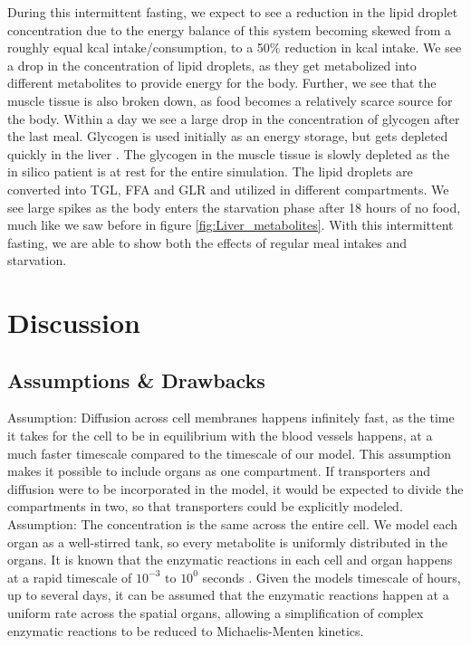 \documentclass{IEEEtran}
\begin{document}
During this intermittent fasting, we expect to see a reduction in the lipid droplet concentration due to the energy balance of this system becoming skewed from a roughly equal kcal intake/consumption, to a 50\% reduction in kcal intake. We see a drop in the concentration of lipid droplets, as they get metabolized into different metabolites to provide energy for the body. Further, we see that the muscle tissue is also broken down, as food becomes a relatively scarce source for the body. Within a day we see a large drop in the concentration of glycogen after the last meal. Glycogen is used initially as an energy storage, but gets depleted quickly in the liver \cite{miesfeld_mcevoy_2017}. The glycogen in the muscle tissue is slowly depleted as the in silico patient is at rest for the entire simulation. The lipid droplets are converted into TGL, FFA and GLR and utilized in different compartments. We see large spikes as the body enters the starvation phase after 18 hours of no food, much like we saw before in figure \ref{fig:Liver_metabolites}. With this intermittent fasting, we are able to show both the effects of regular meal intakes and starvation. \\

\section{Discussion}

\subsection{Assumptions \& Drawbacks}



Assumption: Diffusion across cell membranes happens infinitely fast, as the time it takes for the cell to be in equilibrium with the blood vessels happens, at a much faster timescale compared to the timescale of our model. This assumption makes it possible to include organs as one compartment. If transporters and diffusion were to be incorporated in the model, it would be expected to divide the compartments in two, so that transporters could be explicitly modeled.\\

Assumption: The concentration is the same across the entire cell. We model each organ as a well-stirred tank, so every metabolite is uniformly distributed in the organs. It is known that the enzymatic reactions in each cell and organ happens at a rapid timescale of $10^{-3} \text{ to } 10^0$ seconds \cite{yasemi_jolicoeur_2021}. Given the models timescale of hours, up to several days, it can be assumed that the enzymatic reactions happen at a uniform rate across the spatial organs, allowing a simplification of complex enzymatic reactions to be reduced to Michaelis-Menten kinetics. \\
\end{document}
